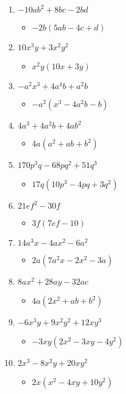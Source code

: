\documentclass{article}
\begin{document}
\begin{enumerate}
\item $-10ab^{2} + 8bc - 2bd$
  \begin{itemize}
  \item $-2b(5ab-4c+d)$
  \end{itemize}
\item $10x^{3}y + 3x^{2}y^{2}$
  \begin{itemize}
  \item $x^{2}y(10x+3y)$
  \end{itemize}
\item $-a^{2}x^{3} + 4a^{4}b + a^{2}b$
  \begin{itemize}
  \item $-a^{2}(x^{3}-4a^{2}b-b)$
  \end{itemize}
\item $4a^{3} + 4a^{2}b + 4ab^{2}$
  \begin{itemize}
  \item $4a(a^{2}+ab+b^{2})$
  \end{itemize}
\item $170p^{3}q - 68pq^{2} + 51q^{3}$
  \begin{itemize}
  \item $17q(10p^{3}-4pq+3q^{2})$
  \end{itemize}
\item $21ef^{2} - 30f$
  \begin{itemize}
  \item $3f(7ef-10)$
  \end{itemize}
\item $14a^{3}x - 4ax^{2} - 6a^{2}$
  \begin{itemize}
  \item $2a(7a^{2}x-2x^{2}-3a)$
  \end{itemize}
\item $8ax^{2} + 28ay - 32ac$
  \begin{itemize}
  \item $4a(2x^{2}+ab+b^{2})$
  \end{itemize}
\item $-6x^{3}y + 9x^{2}y^{2} + 12xy^{3}$
  \begin{itemize}
  \item $-3xy(2x^{2}-3xy-4y^{2})$
  \end{itemize}
\item $2x^{3} - 8x^{2}y + 20xy^{2}$
  \begin{itemize}
  \item $2x(x^{2}-4xy+10y^{2})$

\end{itemize}
\end{enumerate}
\end{document}
